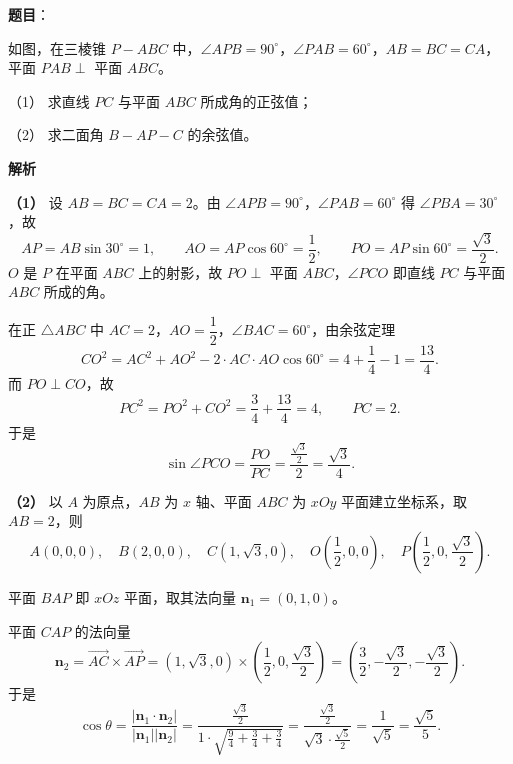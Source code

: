 \begin{answer}

\textbf{题目}：

如图，在三棱锥 $P-ABC$ 中，$\angle APB=90^\circ$，$\angle PAB=60^\circ$，$AB=BC=CA$，平面 $PAB\perp$ 平面 $ABC$。

（1） 求直线 $PC$ 与平面 $ABC$ 所成角的正弦值；

（2） 求二面角 $B-AP-C$ 的余弦值。
\nopagebreak[4]
\begin{center}\end{center}
\nopagebreak[4]
\textbf{解析}

\textbf{（1）} 设 $AB=BC=CA=2$。由 $\angle APB=90^\circ$，$\angle PAB=60^\circ$ 得 $\angle PBA=30^\circ$，故
\nopagebreak[4]
\[AP=AB\sin30^\circ=1,\qquad AO=AP\cos60^\circ=\frac12,\qquad PO=AP\sin60^\circ=\frac{\sqrt3}2.\]
$O$ 是 $P$ 在平面 $ABC$ 上的射影，故 $PO\perp$ 平面 $ABC$，$\angle PCO$ 即直线 $PC$ 与平面 $ABC$ 所成的角。

在正 $\triangle ABC$ 中 $AC=2$，$AO=\dfrac12$，$\angle BAC=60^\circ$，由余弦定理
\nopagebreak[4]
\[CO^2=AC^2+AO^2-2\cdot AC\cdot AO\cos60^\circ=4+\frac14-1=\frac{13}4.\]
而 $PO\perp CO$，故
\nopagebreak[4]
\[PC^2=PO^2+CO^2=\frac34+\frac{13}4=4,\qquad PC=2.\]
于是
\nopagebreak[4]
\[\sin\angle PCO=\frac{PO}{PC}=\frac{\frac{\sqrt3}2}2=\frac{\sqrt3}4.\]

\textbf{（2）} 以 $A$ 为原点，$AB$ 为 $x$ 轴、平面 $ABC$ 为 $xOy$ 平面建立坐标系，取 $AB=2$，则
\nopagebreak[4]
\[A(0,0,0),\quad B(2,0,0),\quad C\left(1,\sqrt3,0\right),\quad O\left(\frac12,0,0\right),\quad P\left(\frac12,0,\frac{\sqrt3}2\right).\]

平面 $BAP$ 即 $xOz$ 平面，取其法向量 $\boldsymbol n_1=(0,1,0)$。

平面 $CAP$ 的法向量
\nopagebreak[4]
\[\boldsymbol n_2=\overrightarrow{AC}\times\overrightarrow{AP}=\left(1,\sqrt3,0\right)\times\left(\frac12,0,\frac{\sqrt3}2\right)=\left(\frac32,-\frac{\sqrt3}2,-\frac{\sqrt3}2\right).\]
于是
\nopagebreak[4]
\[\cos\theta=\frac{\left|\boldsymbol n_1\cdot\boldsymbol n_2\right|}{|\boldsymbol n_1||\boldsymbol n_2|}=\frac{\frac{\sqrt3}2}{1\cdot\sqrt{\frac94+\frac34+\frac34}}=\frac{\frac{\sqrt3}2}{\sqrt3\cdot\frac{\sqrt5}2}=\frac1{\sqrt5}=\frac{\sqrt5}5.\]



\end{answer}
